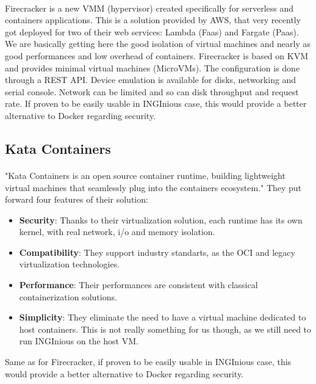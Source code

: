 \paragraph{} Firecracker is a new VMM (hypervisor) created specifically for serverless and containers applications.  \cite{agachefirecracker}  This is a solution provided by AWS, that very recently got deployed for two of their web services: Lambda (Faas) and Fargate (Paas).  We are basically getting here the good isolation of virtual machines and nearly as good performances and low overhead of containers.  Firecracker is based on KVM and provides minimal virtual machines (MicroVMs).  The configuration is done through a REST API.  Device emulation is available for disks, networking and serial console.  Network can be limited and so can disk throughput and request rate.  If proven to be easily usable in INGInious case, this would provide a better alternative to Docker regarding security.

\subsection{Kata Containers}
\paragraph{}"Kata Containers is an open source container runtime, building lightweight virtual machines that seamlessly plug into the containers ecosystem." \cite{kata}  They put forward four features of their solution:
\begin{itemize}
\renewcommand\labelitemi{--}
  \item \textbf{Security}: Thanks to their virtualization solution, each runtime has its own kernel, with real network, i/o and memory isolation.
  \item \textbf{Compatibility}:  They support industry standarts, as the OCI\cite{oci} and legacy virtualization technologies.
  \item \textbf{Performance}:  Their performances are consistent with classical containerization solutions.
  \item \textbf{Simplicity}:  They eliminate the need to have a virtual machine dedicated to host containers.  This is not really something for us though, as we still need to run INGInious on the host VM.
\end{itemize}
Same as for Firecracker, if proven to be easily usable in INGInious case, this would provide a better alternative to Docker regarding security.

